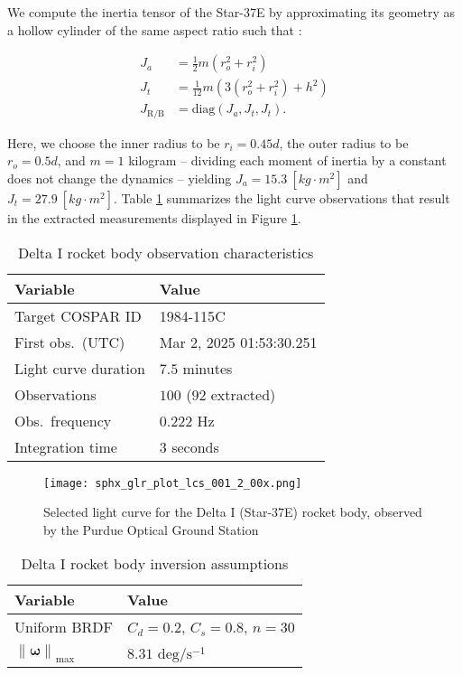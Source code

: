 \documentclass[a4paper,twocolumn]{spaceDebrisC} %
\newcommand{\vctr}[1]{\bm{#1}}
\newcommand{\norm}[1]{\left\lVert#1\right\rVert}
\newcommand{\figbig}[0]{0.5\textwidth}
\begin{document}
We compute the inertia tensor of the Star-37E by approximating its geometry as a hollow cylinder of the same aspect ratio such that \cite{serway2019}:

\begin{align}
 J_a &= \frac{1}{2} m \left(r_o^2+r_i^2\right) \\
 J_t &= \frac{1}{12} m \left(3 \left(r_o^2+r_i^2\right) + h^2\right) \\
 J_\text{R/B} &= \text{diag} \left(J_a, J_t, J_t\right).
\end{align}

Here, we choose the inner radius to be $r_i=0.45d$, the outer radius to be $r_o=0.5d$, and $m=1$ kilogram -- dividing each moment of inertia by a constant does not change the dynamics -- yielding $J_a = 15.3 \: [kg \cdot m^2]$ and $J_t = 27.9 \: [kg \cdot m^2]$. Table \ref{tb:case1_in} summarizes the light curve observations that result in the extracted measurements displayed in Figure \ref{fig:rb_lc_obs}.

\begin{table}[H]
  \centering
  \caption{Delta I rocket body observation characteristics}
  \vspace*{6pt}
  \begin{tabular}{|l|l|}
  \hline
  \textbf{Variable} & \textbf{Value} \\ \hline
 Target COSPAR ID & 1984-115C \\ \hline
 First obs.\ (UTC) & Mar 2, 2025 01:53:30.251 \\ \hline
 Light curve duration & $7.5$ minutes \\ \hline
 Observations & $100$ ($92$ extracted) \\ \hline
 Obs.\ frequency & $0.222$ Hz \\ \hline
 Integration time & $3$ seconds \\ \hline
  \end{tabular}
  \label{tb:case1_in}
\end{table}

\begin{figure}[H]
  \centering
  \texttt{[image: sphx\_glr\_plot\_lcs\_001\_2\_00x.png]}
  \caption{Selected light curve for the Delta I (Star-37E) rocket body, observed by the Purdue Optical Ground Station}
  \label{fig:rb_lc_obs}
\end{figure}

\begin{table}[H]
  \centering
  \caption{Delta I rocket body inversion assumptions}
  \vspace*{6pt}
  \begin{tabular}{|l|l|}
  \hline
  \textbf{Variable} & \textbf{Value} \\ \hline
 Uniform BRDF & $C_d=0.2$, $C_s=0.8$, $n=30$ \\ \hline
  $\norm{\vctr{\omega}}_\text{max}$ & $8.31$ $\text{deg} / \text{s}^{-1}$ \\ \hline
  \end{tabular}
  \label{tb:case1_ass}
\end{table}
\end{document}
